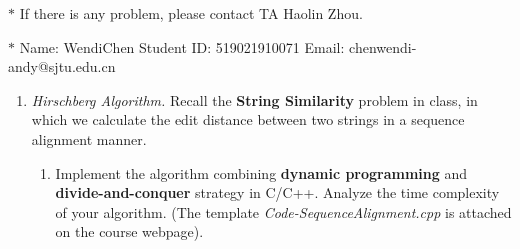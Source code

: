 \documentclass[12pt,a4paper]{article}
\theoremstyle{definition}
\begin{document}
\noindent

\noindent{}
\begin{center}
\footnotesize{\color{red}$*$ If there is any problem, please contact TA Haolin Zhou.}

\footnotesize{\color{blue}$*$ Name: WendiChen  \quad Student ID: 519021910071 \quad Email: chenwendi-andy@sjtu.edu.cn}
\end{center}

\begin{enumerate}
    \item
    \textit{Hirschberg Algorithm.} Recall the \textbf{String Similarity} problem in class, in which we calculate the edit distance between two strings in a sequence alignment manner.
    \begin{enumerate}
    	\item
    	Implement the algorithm combining \textbf{dynamic programming} and \textbf{divide-and-conquer} strategy in C/C++. Analyze the time complexity of your algorithm. {\color{blue}(The template \emph{Code-SequenceAlignment.cpp} is attached on the course webpage)}.
    	

\end{enumerate}
\end{enumerate}
\end{document}
